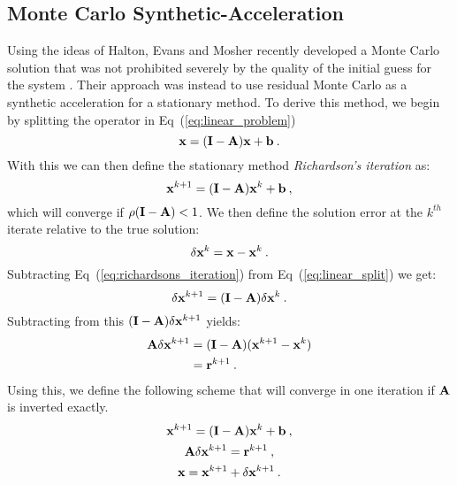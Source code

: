 \subsection{Monte Carlo Synthetic-Acceleration}
\label{subsec:mcsa}
Using the ideas of Halton, Evans and Mosher recently developed a Monte
Carlo solution that was not prohibited severely by the quality of the
initial guess for the system \citep{evans_2009}. Their approach was
instead to use residual Monte Carlo as a synthetic acceleration for a
stationary method. To derive this method, we begin by splitting the
operator in Eq~(\ref{eq:linear_problem}) 
\begin{equation}
  \mathbf{x} = (\mathbf{I} - \mathbf{A})\mathbf{x} + \mathbf{b}\:.
  \label{eq:linear_split}
\end{equation}
With this we can then define the stationary method
\textit{Richardson's iteration} as:
\begin{equation}
  \mathbf{x}^{k+1} = (\mathbf{I} - \mathbf{A})\mathbf{x}^k + \mathbf{b}\:,
  \label{eq:richardsons_iteration}
\end{equation}
which will converge if $\rho(\mathbf{I} - \mathbf{A}) < 1$. We then define the
solution error at the $k^{th}$ iterate relative to the true solution:
\begin{equation}
  \delta \mathbf{x}^k = \mathbf{x} - \mathbf{x}^k\:.
  \label{eq:mcsa_error}
\end{equation}
Subtracting Eq~(\ref{eq:richardsons_iteration}) from
Eq~(\ref{eq:linear_split}) we get:
\begin{equation}
  \delta \mathbf{x}^{k+1} = (\mathbf{I} - \mathbf{A})\delta \mathbf{x}^k\:.
  \label{eq:mcsa_setup_1}
\end{equation}
Subtracting from this $(\mathbf{I} - \mathbf{A})\delta \mathbf{x}^{k+1}$ yields:
\begin{equation}
  \begin{split}
    \mathbf{A}\delta \mathbf{x}^{k+1} &= (\mathbf{I} -
    \mathbf{A})(\mathbf{x}^{k+1}-\mathbf{x}^{k}) \\ &= \mathbf{r}^{k+1}\:.
    \label{eq:mcsa_setup_2}
  \end{split}
\end{equation}
Using this, we define the following scheme that will converge in one
iteration if $\mathbf{A}$ is inverted exactly.
\begin{subequations}
  \begin{gather}
    \mathbf{x}^{k+1} = (\mathbf{I} - \mathbf{A})\mathbf{x}^k + \mathbf{b}\:,\\
    \mathbf{A} \delta \mathbf{x}^{k+1} = \mathbf{r}^{k+1}\:,\\
    \mathbf{x} = \mathbf{x}^{k+1} + \delta \mathbf{x}^{k+1}\:.
  \end{gather}
  \label{eq:mcsa_setup_3}
\end{subequations}
